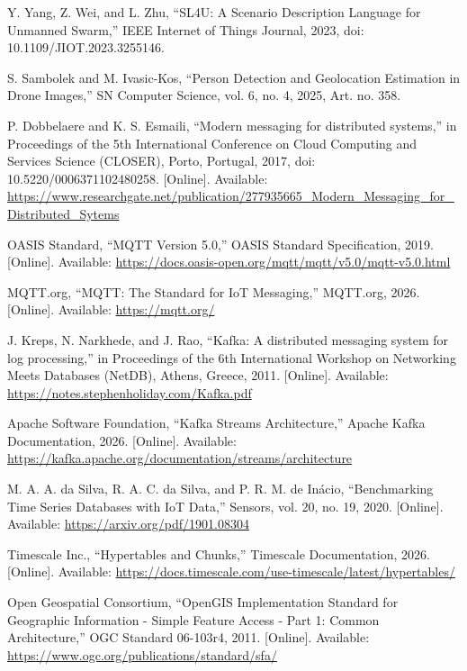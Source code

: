 \documentclass[12pt]{article}
\begin{document}
\begin{enumerate}[label={[\arabic*]},leftmargin=2em,itemsep=0.4em]
\item Y. Yang, Z. Wei, and L. Zhu, ``SL4U: A Scenario Description Language for Unmanned Swarm,'' IEEE Internet of Things Journal, 2023, doi: 10.1109/JIOT.2023.3255146.

\item S. Sambolek and M. Ivasic-Kos, ``Person Detection and Geolocation Estimation in Drone Images,'' SN Computer Science, vol. 6, no. 4, 2025, Art. no. 358.

\item P. Dobbelaere and K. S. Esmaili, ``Modern messaging for distributed systems,'' in Proceedings of the 5th International Conference on Cloud Computing and Services Science (CLOSER), Porto, Portugal, 2017, doi: 10.5220/0006371102480258. [Online]. Available: \url{https://www.researchgate.net/publication/277935665_Modern_Messaging_for_Distributed_Sytems}

\item OASIS Standard, ``MQTT Version 5.0,'' OASIS Standard Specification, 2019. [Online]. Available: \url{https://docs.oasis-open.org/mqtt/mqtt/v5.0/mqtt-v5.0.html}

\item MQTT.org, ``MQTT: The Standard for IoT Messaging,'' MQTT.org, 2026. [Online]. Available: \url{https://mqtt.org/}

\item J. Kreps, N. Narkhede, and J. Rao, ``Kafka: A distributed messaging system for log processing,'' in Proceedings of the 6th International Workshop on Networking Meets Databases (NetDB), Athens, Greece, 2011. [Online]. Available: \url{https://notes.stephenholiday.com/Kafka.pdf}

\item Apache Software Foundation, ``Kafka Streams Architecture,'' Apache Kafka Documentation, 2026. [Online]. Available: \url{https://kafka.apache.org/documentation/streams/architecture}

\item M. A. A. da Silva, R. A. C. da Silva, and P. R. M. de Inácio, ``Benchmarking Time Series Databases with IoT Data,'' Sensors, vol. 20, no. 19, 2020. [Online]. Available: \url{https://arxiv.org/pdf/1901.08304}

\item Timescale Inc., ``Hypertables and Chunks,'' Timescale Documentation, 2026. [Online]. Available: \url{https://docs.timescale.com/use-timescale/latest/hypertables/}

\item Open Geospatial Consortium, ``OpenGIS Implementation Standard for Geographic Information - Simple Feature Access - Part 1: Common Architecture,'' OGC Standard 06-103r4, 2011. [Online]. Available: \url{https://www.ogc.org/publications/standard/sfa/}


\end{enumerate}
\end{document}
